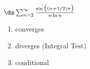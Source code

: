 {$\ds \sum_{n=2}^\infty \frac{\sin\big((n+1/2)\pi\big)}{n\ln n}$
}
{\begin{enumerate}
	\item converges
	\item	diverges (Integral Test)
	\item conditional
\end{enumerate}
}